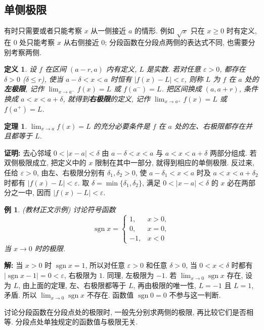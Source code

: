 \documentclass[UTF8,openany]{ctexbook}
\theoremstyle{chinesetextbook}
\newtheorem{definition}{定义}[section]
\newtheorem{example}{例}[section]
\newtheorem{theorem}{定理}[section]
\newenvironment{cnproof}{\par\indent\textbf{证明:} \ignorespaces}{\par}
\newenvironment{cnsolution}{\par\indent\textbf{解:} \ignorespaces}{\par}
\begin{document}
\subsection{单侧极限}
有时只需要或者只能考察 $x$ 从一侧接近 $a$ 的情形. 例如 $\sqrt x$ 只在 $x\ge0$ 时有定义, 在 $0$ 处只能考察 $x$ 从右侧接近 $0$; 分段函数在分段点两侧的表达式不同, 也需要分别考察两侧.
\begin{definition}
设 $f$ 在区间 $(a-r,a)$ 内有定义, $L$ 是实数. 若对任意 $\varepsilon>0$, 都存在 $\delta>0$ ($\delta\le r$), 使当 $a-\delta<x<a$ 时恒有 $|f(x)-L|<\varepsilon$, 则称 $L$ 为 $f$ 在 $a$ 处的\textbf{左极限}, 记作 $\displaystyle\lim_{x\to a^-}f(x)=L$ 或 $f(a^-)=L$. 把区间换成 $(a,a+r)$, 条件换成 $a<x<a+\delta$, 就得到\textbf{右极限}的定义, 记作 $\displaystyle\lim_{x\to a^+}f(x)=L$ 或 $f(a^+)=L$.
\end{definition}
\begin{theorem}
$\displaystyle\lim_{x\to a}f(x)=L$ 的充分必要条件是 $f$ 在 $a$ 处的左、右极限都存在并且都等于 $L$.
\end{theorem}
\begin{cnproof}
去心邻域 $0<|x-a|<\delta$ 由 $a-\delta<x<a$ 与 $a<x<a+\delta$ 两部分组成. 若双侧极限成立, 把定义中的 $x$ 限制在其中一部分, 就得到相应的单侧极限. 反过来, 任给 $\varepsilon>0$, 由左、右极限分别有 $\delta_1,\delta_2>0$, 使 $a-\delta_1<x<a$ 时及 $a<x<a+\delta_2$ 时都有 $|f(x)-L|<\varepsilon$. 取 $\delta=\min\{\delta_1,\delta_2\}$, 满足 $0<|x-a|<\delta$ 的 $x$ 必在两部分之一中, 因而 $|f(x)-L|<\varepsilon$.
\end{cnproof}
\begin{example}
\textnormal{(教材正文示例)} 讨论符号函数
\[
\operatorname{sgn}x=\begin{cases}1,&x>0,\\0,&x=0,\\-1,&x<0\end{cases}
\]
当 $x\to0$ 时的极限.
\end{example}
\begin{cnsolution}
当 $x>0$ 时 $\operatorname{sgn}x=1$, 所以对任意 $\varepsilon>0$ 和任意 $\delta>0$, 当 $0<x<\delta$ 时都有 $|\operatorname{sgn}x-1|=0<\varepsilon$, 右极限为 $1$. 同理, 左极限为 $-1$. 若 $\displaystyle\lim_{x\to0}\operatorname{sgn}x$ 存在, 设为 $L$, 由上面的定理, 左、右极限都等于 $L$, 再由极限的唯一性, $L=-1$ 且 $L=1$, 矛盾. 所以 $\displaystyle\lim_{x\to0}\operatorname{sgn}x$ 不存在. 函数值 $\operatorname{sgn}0=0$ 不参与这一判断.
\end{cnsolution}
讨论分段函数在分段点处的极限时, 一般先分别求两侧的极限, 再比较它们是否相等. 分段点处单独规定的函数值与极限无关.
\end{document}
